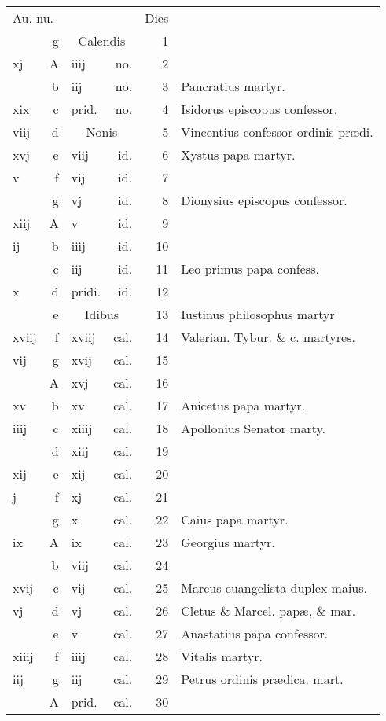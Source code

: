 \documentclass[a5paper,10pt]{book}
\def\ae{æ}
\begin{document}
\begin{center}
\begin{tabular}{l r l r r l}
\multicolumn{2}{l}{\color{red}Au. nu.} & & & \color{red} Dies & \\
 & g & \multicolumn{2}{c}{\color{red} Calendis} & 1 & \\
xj & \color{red} A & iiij & no. & 2 & \\
 & b & iij & no. & 3 & Pancratius martyr. \color{black} \\
xix & c & \color{red} prid. & no. & 4 & Isidorus episcopus confessor. \color{black} \\
viij & d & \multicolumn{2}{c}{\color{red} Nonis} & 5 & Vincentius confessor ordinis pr\ae di. \color{black} \\
xvj & e & viij & id. & 6 & Xystus papa martyr. \color{black} \\
v & f & vij & id. & 7 & \\
 & g & vj & id. & 8 & Dionysius episcopus confessor. \color{black} \\
xiij & \color{red} A & v & id. & 9 & \\
ij & b & iiij & id. & 10 & \\
 & c & iij & id. & 11 & Leo primus papa confess. \color{black} \\
x & d & \color{red} pridi. & id. & 12 & \\
 & e & \multicolumn{2}{c}{\color{red} Idibus} & 13 & Iustinus philosophus martyr \\
xviij & f & xviij & cal. & 14 & Valerian. Tybur. \& c. martyres. \\
vij & g & xvij & cal. & 15 & \\
 & \color{red} A & xvj & cal. & 16 & \\
xv & b & xv & cal. & 17 & Anicetus papa martyr. \\
iiij & c & xiiij & cal. & 18 & Apollonius Senator marty. \\
 & d & xiij & cal. & 19 & \\
xij & e & xij & cal. & 20 & \\
j & f & xj & cal. & 21 & \\
 & g & x & cal. & 22 & Caius papa martyr. \\
ix & \color{red} A & ix & cal. & 23 & \color{red} Georgius martyr.\\
 & b & viij & cal. & 24 & \\
xvij & c & vij & cal. & 25 & \color{red} Marcus euangelista duplex maius. \color{black} \\
vj & d & vj & cal. & 26 & Cletus \& Marcel. pap\ae , \& mar. \\
 & e & v & cal. & 27 & Anastatius papa confessor.\\
xiiij & f & iiij & cal. & 28 & Vitalis martyr.\\
iij & g & iij & cal. & 29 & Petrus ordinis pr\ae dica. mart. \\
 & \color{red} A & \color{red} prid. & cal. & 30 & \\

\end{tabular}
\end{center}
\end{document}
